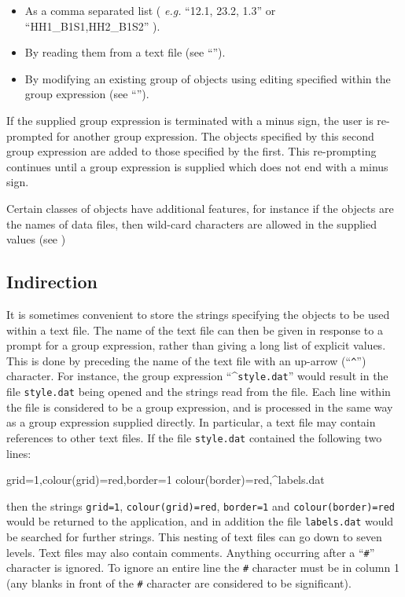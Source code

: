 \documentclass[twoside,11pt]{starlink}
\begin{document}
\begin{itemize}
\item As a comma separated list ( \emph{e.g.} ``12.1, 23.2, 1.3''
     or ``HH1\_B1S1,HH2\_B1S2'' ).

\item By reading them from a text file (see
     ``'').

\item By modifying an existing group of objects using editing
     specified within the group expression (see
     ``'').
\end{itemize}

If the supplied group expression is terminated with a minus
sign, the user is re-prompted for another group expression. The
objects specified by this second group expression are added to
those specified by the first. This re-prompting continues until
a group expression is supplied which does not end with a minus
sign.

Certain classes of objects have additional features, for
instance if the objects are the names of data files, then wild-card characters
are allowed in the supplied values (see )

\subsection{\label{SEC:IND}Indirection}
It is sometimes convenient to store the strings specifying the objects to
be used within a text file. The name of the text file can then be given
in response to a prompt for a group expression, rather than giving a long
list of explicit values. This is done by preceding the name of the text
file with an up-arrow (``\verb+^+'') character. For instance, the group
expression ``\^{}\verb+style.dat+'' would result in the file
\verb+style.dat+ being opened and the strings read from the file. Each
line within the file is considered to be a group expression, and is
processed in the same way as a group expression supplied directly. In
particular, a text file may contain references to other text files. If
the file
\verb+style.dat+ contained the following two lines:

\begin{terminalv}
grid=1,colour(grid)=red,border=1
colour(border)=red,^labels.dat
\end{terminalv}

then the strings \verb+grid=1+, \verb+colour(grid)=red+, \verb+border=1+
and \verb+colour(border)=red+ would be returned to the
application, and in addition the file \verb+labels.dat+ would be
searched for further strings. This nesting of text files can go
down to seven levels. Text files may also contain comments.
Anything occurring after a ``\verb+#+'' character is ignored. To ignore
an entire line the \verb+#+ character must be in column 1 (any blanks in
front of the \verb+#+ character are considered to be significant).
\end{document}
